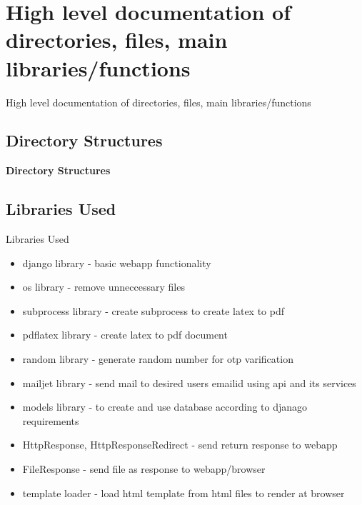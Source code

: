 \documentclass [] {beamer}
\begin{document}
\section{High level documentation of directories, files, main libraries/functions}

\begin{frame}{High level documentation of directories, files, main libraries/functions}

\subsection{Directory Structures}
\textbf{Directory Structures}
\end{frame}

\subsection{Libraries Used}
\begin{frame}{Libraries Used}

\begin{itemize}
    \item django library   - basic webapp functionality
    \item os library - remove unneccessary files
    \item subprocess library - create subprocess to create latex to pdf
    \item pdflatex library - create latex to pdf document
    \item random library - generate random number for otp varification
\item mailjet library - send mail to desired users emailid using api and its services
\item models library - to create and use database according to djanago requirements
\item HttpResponse, HttpResponseRedirect -  send return response to webapp 
\item FileResponse - send file as response to webapp/browser
\item template loader - load html template from html files to render at browser
\end{itemize}


 
\end{frame}
\end{document}
